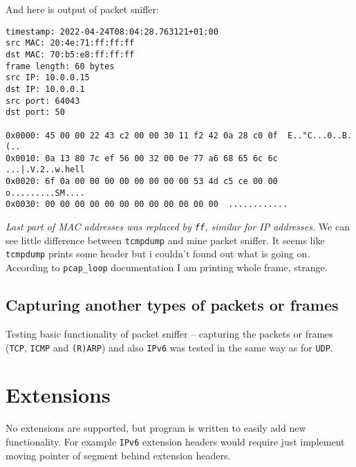 \documentclass[11pt, a4paper]{article}
\begin{document}
            And here is output of packet sniffer:
            \begin{verbatim}
timestamp: 2022-04-24T08:04:28.763121+01:00
src MAC: 20:4e:71:ff:ff:ff
dst MAC: 70:b5:e8:ff:ff:ff
frame length: 60 bytes
src IP: 10.0.0.15
dst IP: 10.0.0.1
src port: 64043
dst port: 50

0x0000: 45 00 00 22 43 c2 00 00 30 11 f2 42 0a 28 c0 0f  E.."C...0..B.(..
0x0010: 0a 13 80 7c ef 56 00 32 00 0e 77 a6 68 65 6c 6c  ...|.V.2..w.hell
0x0020: 6f 0a 00 00 00 00 00 00 00 00 53 4d c5 ce 00 00  o.........SM....
0x0030: 00 00 00 00 00 00 00 00 00 00 00 00  ............
            \end{verbatim}
            \textit{Last part of MAC addresses was replaced by \texttt{ff}, similar for IP addresses.}\linebreak
            We can see little difference between \texttt{tcmpdump} and mine packet sniffer. It seems like \texttt{tcmpdump} prints some header but i couldn't found out what is going on. According to \texttt{pcap\_loop} documentation \cite{pcaploop} I am printing whole frame, strange.
        \subsection{Capturing another types of packets or frames}
            Testing basic functionality of packet sniffer -- capturing the packets or frames (\texttt{TCP}, \texttt{ICMP} and \texttt{(R)ARP}) and also \texttt{IPv6} was tested in the same way as for \texttt{UDP}.
        
    \section{Extensions}
        No extensions are supported, but program is written to easily add new functionality. For example \texttt{IPv6} extension headers would require just implement moving pointer of segment behind extension headers.
    
    \newpage
    
\end{document}

